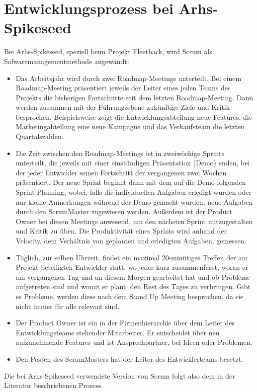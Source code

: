 \documentclass[ngerman]{scrartcl}
\begin{document}
\section{Entwicklungsprozess bei Arhs-Spikeseed}
Bei Arhs-Spikeseed, speziell beim Projekt Fleetback, wird Scrum als Sofwaremanagementmethode angewandt:
\begin{itemize}
    \item Das Arbeitsjahr wird durch zwei Roadmap-Meetings unterteilt. Bei einem Roadmap-Meeting präsentiert jeweils der Leiter eines jeden Teams des Projekts die bisherigen Fortschritte seit dem letzten Roadmap-Meeting. Dann werden zusammen mit der Führungsebene zukünftige Ziele und Kritik besprochen. Beispielsweise zeigt die Entwicklungsabteilung neue Features, die Marketingabteilung eine neue Kampagne und das Verkaufsteam die letzten Quartalszahlen.
    \item Die Zeit zwischen den Roadmap-Meetings ist in zweiwöchige Sprints unterteilt, die jeweils mit einer einstündigen Präsentation (Demo) enden, bei der jeder Entwickler seinen Fortschritt der vergangenen zwei Wochen präsentiert. Der neue Sprint beginnt dann mit dem auf die Demo folgenden Sprint-Planning, wobei, falls die individuellen Aufgaben erledigt wurden oder nur kleine Anmerkungen während der Demo gemacht wurden, neue Aufgaben durch den ScrumMaster zugewiesen werden. Außerdem ist der Product Owner bei diesen Meetings anwesend, um den nächsten Sprint mitzugestalten und Kritik zu üben. Die Produktivität eines Sprints wird anhand der Velocity, dem Verhältnis von geplanten und erledigten Aufgaben, gemessen. 
    \item Täglich, zur selben Uhrzeit, findet ein maximal 20-minütiges Treffen der am Projekt beteiligten Entwickler statt, wo jeder kurz zusammenfasst, woran er am vergangenen Tag und an diesem Morgen gearbeitet hat und ob Probleme aufgetreten sind und womit er plant, den Rest des Tages zu verbringen. Gibt es Probleme, werden diese nach dem Stand Up Meeting besprochen, da sie nicht immer für alle relevant sind.
    \item Der Product Owner ist ein in der Firmenhierarchie über dem Leiter des Entwicklungsteams stehender Mitarbeiter. Er entscheidet über neu aufzunehmende Features und ist Ansprechpartner, bei Ideen oder Problemen.
    \item Den Posten des ScrumMasters hat der Leiter des Entwicklerteams besetzt.
\end{itemize}
Die bei Arhs-Spikeseed verwendete Version von Scrum folgt also dem in der Literatur\cite{2010apvx} beschriebenen Prozess.
\end{document}
